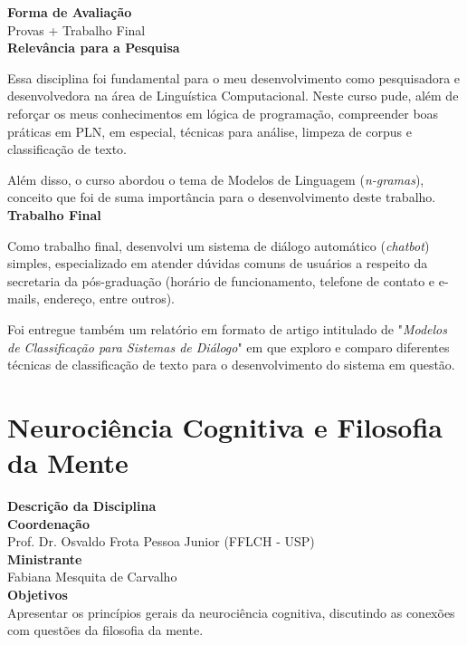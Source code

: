 \textbf{Forma de Avaliação}\\
\hspace*{1.6em}Provas + Trabalho Final\\

\textbf{Relevância para a Pesquisa}

Essa disciplina foi fundamental para o meu desenvolvimento como pesquisadora e desenvolvedora na área de Linguística Computacional. Neste curso pude, além de reforçar os meus conhecimentos em lógica de programação, compreender boas práticas em PLN, em especial, técnicas para análise, limpeza de corpus e classificação de texto. 

Além disso, o curso abordou o tema de Modelos de Linguagem (\textit{n-gramas}), conceito que foi de suma importância para o desenvolvimento deste trabalho.\\

\textbf{Trabalho Final}

Como trabalho final, desenvolvi um sistema de diálogo automático (\textit{chatbot}) simples, especializado em atender dúvidas comuns de usuários a respeito da secretaria da pós-graduação (horário de funcionamento, telefone de contato e e-mails, endereço, entre outros). 

Foi entregue também um relatório em formato de artigo intitulado de "\textit{Modelos de Classificação para Sistemas de Diálogo}"  em que exploro e comparo diferentes técnicas de classificação de texto para o desenvolvimento do sistema em questão.

\section{Neurociência Cognitiva e Filosofia da Mente}
\textbf{\Large Descrição da Disciplina}\\

\textbf{Coordenação}\\
\hspace*{1.6em}Prof. Dr. Osvaldo Frota Pessoa Junior (FFLCH - USP)\\
\hspace*{1.6em}\textbf{Ministrante}\\
\hspace*{1.6em}Fabiana Mesquita de Carvalho\\

\textbf{Objetivos}\\
\hspace*{1.6em}Apresentar os princípios gerais da neurociência cognitiva, discutindo as conexões com questões da filosofia da mente.\\

